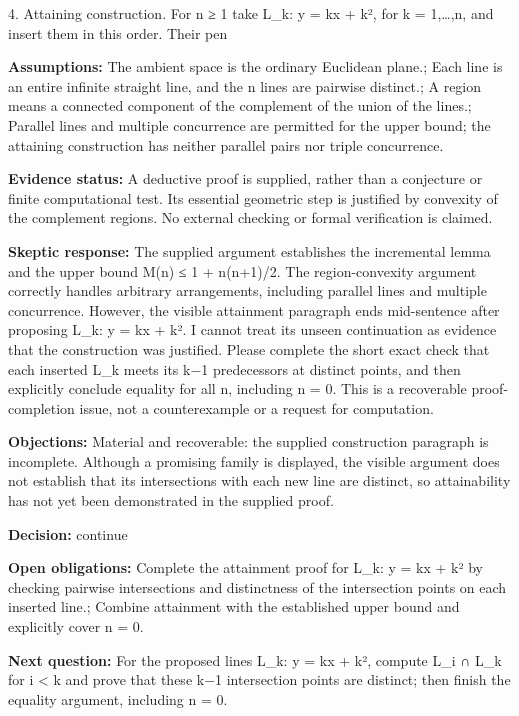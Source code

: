 \documentclass[11pt]{article}
\begin{document}
4. Attaining construction. For n ≥ 1 take L\_k: y = kx + k², for k = 1,…,n, and insert them in this order. Their pen\par
\textbf{Assumptions:} The ambient space is the ordinary Euclidean plane.; Each line is an entire infinite straight line, and the n lines are pairwise distinct.; A region means a connected component of the complement of the union of the lines.; Parallel lines and multiple concurrence are permitted for the upper bound; the attaining construction has neither parallel pairs nor triple concurrence.\par
\textbf{Evidence status:} A deductive proof is supplied, rather than a conjecture or finite computational test. Its essential geometric step is justified by convexity of the complement regions. No external checking or formal verification is claimed.\par
\textbf{Skeptic response:} The supplied argument establishes the incremental lemma and the upper bound M(n) ≤ 1 + n(n+1)/2. The region-convexity argument correctly handles arbitrary arrangements, including parallel lines and multiple concurrence. However, the visible attainment paragraph ends mid-sentence after proposing L\_k: y = kx + k². I cannot treat its unseen continuation as evidence that the construction was justified. Please complete the short exact check that each inserted L\_k meets its k−1 predecessors at distinct points, and then explicitly conclude equality for all n, including n = 0. This is a recoverable proof-completion issue, not a counterexample or a request for computation.\par
\textbf{Objections:} Material and recoverable: the supplied construction paragraph is incomplete. Although a promising family is displayed, the visible argument does not establish that its intersections with each new line are distinct, so attainability has not yet been demonstrated in the supplied proof.\par
\textbf{Decision:} continue\par
\textbf{Open obligations:} Complete the attainment proof for L\_k: y = kx + k² by checking pairwise intersections and distinctness of the intersection points on each inserted line.; Combine attainment with the established upper bound and explicitly cover n = 0.\par
\textbf{Next question:} For the proposed lines L\_k: y = kx + k², compute L\_i ∩ L\_k for i \textless{} k and prove that these k−1 intersection points are distinct; then finish the equality argument, including n = 0.\par
\end{document}

